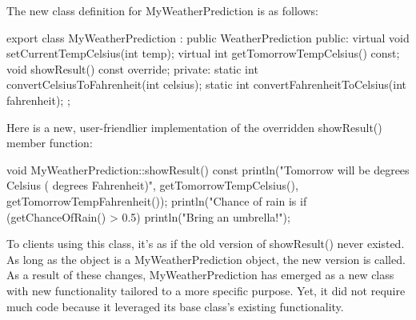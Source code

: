 The new class definition for MyWeatherPrediction is as follows:

\begin{cpp}
export class MyWeatherPrediction : public WeatherPrediction
{
    public:
        virtual void setCurrentTempCelsius(int temp);
        virtual int getTomorrowTempCelsius() const;
        void showResult() const override;
    private:
        static int convertCelsiusToFahrenheit(int celsius);
        static int convertFahrenheitToCelsius(int fahrenheit);
};
\end{cpp}

Here is a new, user-friendlier implementation of the overridden showResult() member function:

\begin{cpp}
void MyWeatherPrediction::showResult() const
{
    println("Tomorrow will be {} degrees Celsius ({} degrees Fahrenheit)",
        getTomorrowTempCelsius(), getTomorrowTempFahrenheit());
    println("Chance of rain is {}%
    if (getChanceOfRain() > 0.5) { println("Bring an umbrella!"); }
}
\end{cpp}

To clients using this class, it’s as if the old version of showResult() never existed. As long as the object is a MyWeatherPrediction object, the new version is called. As a result of these changes, MyWeatherPrediction has emerged as a new class with new functionality tailored to a more specific purpose. Yet, it did not require much code because it leveraged its base class’s existing functionality.






